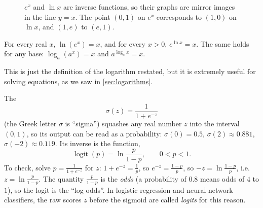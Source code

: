 \begin{figure}[htbp]
\centering
{}
\caption{$e^x$ and $\ln x$ are inverse functions, so their graphs are mirror
  images in the line $y = x$. The point $(0, 1)$ on $e^x$ corresponds to
  $(1, 0)$ on $\ln x$, and $(1, e)$ to $(e, 1)$.}
\label{fig:inverse}
\end{figure}

\begin{theorem}
\label{thm:exp-ln-inverse}
For every real $x$, $\ln(e^x) = x$, and for every $x > 0$, $e^{\ln x} = x$.
The same holds for any base: $\log_a(a^x) = x$ and $a^{\log_a x} = x$.
\end{theorem}

This is just the definition of the logarithm restated, but it is extremely
useful for solving equations, as we saw in \cref{sec:logarithms}.

\begin{mlnote}
The 
\[
  \sigma(z) = \frac{1}{1 + e^{-z}}
\]
(the Greek letter $\sigma$ is ``sigma'') squashes any real number $z$ into the
interval $(0, 1)$, so its output can be read as a probability:
$\sigma(0) = 0.5$, $\sigma(2) \approx 0.881$, $\sigma(-2) \approx 0.119$. Its
inverse is the  function,
\[
  \operatorname{logit}(p) = \ln\frac{p}{1 - p}, \qquad 0 < p < 1 .
\]
To check, solve $p = \frac{1}{1+e^{-z}}$ for $z$: $1 + e^{-z} = \frac1p$, so
$e^{-z} = \frac{1-p}{p}$, so $-z = \ln\frac{1-p}{p}$, i.e.\
$z = \ln\frac{p}{1-p}$. The quantity $\frac{p}{1-p}$ is the \emph{odds} (a
probability of $0.8$ means odds of $4$ to $1$), so the logit is the
``log-odds''. In logistic regression and neural network classifiers, the raw
scores $z$ before the sigmoid are called \emph{logits} for this reason.
\end{mlnote}

